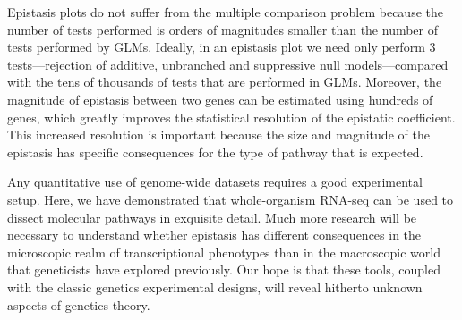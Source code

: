 \documentclass[9pt,twocolumn,twoside]{pnas-new}
\begin{document}
Epistasis plots do not suffer from the multiple comparison problem because the
number of tests performed is orders of magnitudes smaller than the number
of tests performed by GLMs. Ideally, in an epistasis plot we need only perform
3 tests---rejection of additive, unbranched and suppressive null models---compared
with the tens of thousands of tests that are performed in GLMs. Moreover, the
magnitude of epistasis between two genes can be estimated using hundreds of genes,
which greatly improves the statistical resolution of the epistatic coefficient.
This increased resolution is important because the size and magnitude of the
epistasis has specific consequences for the type of pathway that is expected.

Any quantitative use of genome-wide datasets requires a good experimental setup.
Here, we have demonstrated that whole-organism RNA-seq can be used to dissect
molecular pathways in exquisite detail. Much more research will be necessary
to understand whether epistasis has different consequences in the microscopic
realm of transcriptional phenotypes than in the macroscopic world that geneticists
have explored previously. Our hope is that these tools, coupled with the classic
genetics experimental  designs, will reveal hitherto unknown aspects of genetics
theory.
\end{document}
